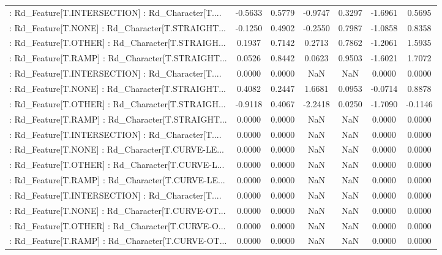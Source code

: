 \begin{longtable}{p{4cm}cccccc}
 : Rd\_Feature[T.INTERSECTION] : Rd\_Character[T.... & -0.5633 &    0.5779 & -0.9747 &       0.3297 & -1.6961 &  0.5695 \\
 : Rd\_Feature[T.NONE] : Rd\_Character[T.STRAIGHT... & -0.1250 &    0.4902 & -0.2550 &       0.7987 & -1.0858 &  0.8358 \\
 : Rd\_Feature[T.OTHER] : Rd\_Character[T.STRAIGH... &  0.1937 &    0.7142 &  0.2713 &       0.7862 & -1.2061 &  1.5935 \\
 : Rd\_Feature[T.RAMP] : Rd\_Character[T.STRAIGHT... &  0.0526 &    0.8442 &  0.0623 &       0.9503 & -1.6021 &  1.7072 \\
 : Rd\_Feature[T.INTERSECTION] : Rd\_Character[T.... &  0.0000 &    0.0000 &     NaN &          NaN &  0.0000 &  0.0000 \\
 : Rd\_Feature[T.NONE] : Rd\_Character[T.STRAIGHT... &  0.4082 &    0.2447 &  1.6681 &       0.0953 & -0.0714 &  0.8878 \\
 : Rd\_Feature[T.OTHER] : Rd\_Character[T.STRAIGH... & -0.9118 &    0.4067 & -2.2418 &       0.0250 & -1.7090 & -0.1146 \\
 : Rd\_Feature[T.RAMP] : Rd\_Character[T.STRAIGHT... &  0.0000 &    0.0000 &     NaN &          NaN &  0.0000 &  0.0000 \\
 : Rd\_Feature[T.INTERSECTION] : Rd\_Character[T.... &  0.0000 &    0.0000 &     NaN &          NaN &  0.0000 &  0.0000 \\
 : Rd\_Feature[T.NONE] : Rd\_Character[T.CURVE-LE... &  0.0000 &    0.0000 &     NaN &          NaN &  0.0000 &  0.0000 \\
 : Rd\_Feature[T.OTHER] : Rd\_Character[T.CURVE-L... &  0.0000 &    0.0000 &     NaN &          NaN &  0.0000 &  0.0000 \\
 : Rd\_Feature[T.RAMP] : Rd\_Character[T.CURVE-LE... &  0.0000 &    0.0000 &     NaN &          NaN &  0.0000 &  0.0000 \\
 : Rd\_Feature[T.INTERSECTION] : Rd\_Character[T.... &  0.0000 &    0.0000 &     NaN &          NaN &  0.0000 &  0.0000 \\
 : Rd\_Feature[T.NONE] : Rd\_Character[T.CURVE-OT... &  0.0000 &    0.0000 &     NaN &          NaN &  0.0000 &  0.0000 \\
 : Rd\_Feature[T.OTHER] : Rd\_Character[T.CURVE-O... &  0.0000 &    0.0000 &     NaN &          NaN &  0.0000 &  0.0000 \\
 : Rd\_Feature[T.RAMP] : Rd\_Character[T.CURVE-OT... &  0.0000 &    0.0000 &     NaN &          NaN &  0.0000 &  0.0000 \\

\end{longtable}
